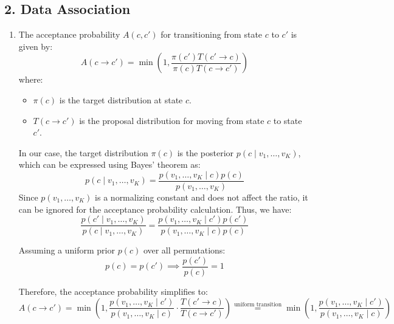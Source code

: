 \documentclass[a4 paper]{article}
\begin{document}
\subsubsection*{}







\newpage
\subsection*{2. Data Association}

\begin{enumerate}
    \item {}
    
    The acceptance probability \( A(c, c') \) for transitioning from state \( c \) to \( c' \) is given by:
    \[
    A(c \to c') = \min \left( 1, \frac{\pi(c') T(c' \to c)}{\pi(c) T(c \to c')} \right)
    \]
    where:
    \begin{itemize}
        \item \( \pi(c) \) is the target distribution at state \( c \).
        \item \( T(c \to c') \) is the proposal distribution for moving from state \( c \) to state \( c' \).
    \end{itemize}

    In our case, the target distribution \( \pi(c) \) is the posterior \( p(c \mid v_1, \ldots, v_K) \), which can be expressed using Bayes' theorem as:
    \[
    p(c \mid v_1, \ldots, v_K) = \frac{p(v_1, \ldots, v_K \mid c) p(c)}{p(v_1, \ldots, v_K)}
    \]
    Since \( p(v_1, \ldots, v_K) \) is a normalizing constant and does not affect the ratio, it can be ignored for the acceptance probability calculation. Thus, we have:
    \[
    \frac{p(c' \mid v_1, \ldots, v_K)}{p(c \mid v_1, \ldots, v_K)} = \frac{p(v_1, \ldots, v_K \mid c') p(c')}{p(v_1, \ldots, v_K \mid c) p(c)}
    \]

    Assuming a uniform prior \( p(c) \) over all permutations:
    \[
    p(c) = p(c') \implies \frac{p(c')}{p(c)} = 1
    \]

    Therefore, the acceptance probability simplifies to:
    \[
    A(c \to c') = \min \left( 1, \frac{p(v_1, \ldots, v_K \mid c')}{p(v_1, \ldots, v_K \mid c)} \cdot \frac{T(c' \to c)}{T(c \to c')} \right)
     \stackrel{\text{uniform transition}}{=} \min \left( 1, \frac{p(v_1, \ldots, v_K \mid c')}{p(v_1, \ldots, v_K \mid c)} \right)
    \]


\end{enumerate}
\end{document}

